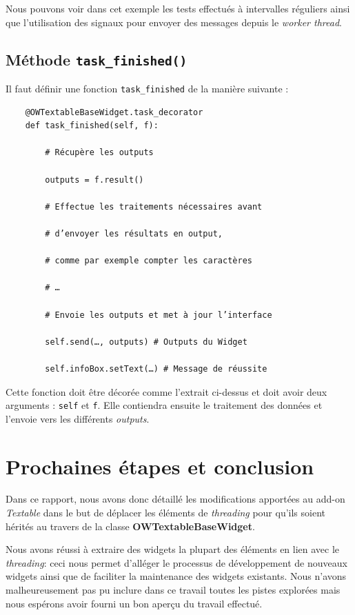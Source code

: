 \documentclass{article}
\begin{document}
Nous pouvons voir dans cet exemple les tests effectués à intervalles réguliers ainsi que l'utilisation des signaux pour envoyer des messages depuis le \textit{worker thread}.

\subsection{Méthode \texttt{task\_finished()}}

Il faut définir une fonction \texttt{task\_finished} de la manière suivante :

\begin{verbatim}
    @OWTextableBaseWidget.task_decorator
    def task_finished(self, f):
    
        # Récupère les outputs
        
        outputs = f.result()
        
        # Effectue les traitements nécessaires avant
        
        # d’envoyer les résultats en output,
        
        # comme par exemple compter les caractères
        
        # …
        
        # Envoie les outputs et met à jour l’interface
        
        self.send(…, outputs) # Outputs du Widget
        
        self.infoBox.setText(…) # Message de réussite
\end{verbatim}

Cette fonction doit être décorée comme l'extrait ci-dessus et doit avoir deux arguments : \texttt{self} et \texttt{f}. Elle contiendra ensuite le traitement des données et l'envoie vers les différents \textit{outputs}.

\section{Prochaines étapes et conclusion}

Dans ce rapport, nous avons donc détaillé les modifications apportées au add-on \textit{Textable} dans le but de déplacer les éléments de \textit{threading} pour qu'ils soient hérités au travers de la classe \textbf{OWTextableBaseWidget}.

Nous avons réussi à extraire des widgets la plupart des éléments en lien avec le \textit{threading}: ceci nous permet d'alléger le processus de développement de nouveaux widgets ainsi que de faciliter la maintenance des widgets existants. Nous n'avons malheureusement pas pu inclure dans ce travail toutes les pistes explorées mais nous espérons avoir fourni un bon aperçu du travail effectué.
\end{document}

